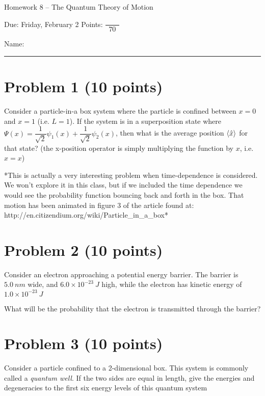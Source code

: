 \documentclass[10pt, letterpaper]{memoir}
\begin{document}
\begin{center}
	{\large Homework 8 -- The Quantum Theory of Motion}
	
	Due: Friday, February 2 \hspace{3em} Points: ${\dfrac{~}{~~70~~}}$
\end{center}

Name: \rule[-.1mm]{15em}{0.1pt}	
	
	\section*{Problem 1  (10 points)}
	Consider a particle-in-a box system where the particle is confined between $x=0$ and $x=1$ (i.e. $L=1$). If the system is in a superposition state where $\Psi(x) = \dfrac{1}{\sqrt{2}}\psi_1(x) + \dfrac{1}{\sqrt{2}}\psi_2(x)$, then what is the average position $\left< \hat{x} \right>$ for that state? (the x-position operator is simply multiplying the function by $x$, i.e.  $\hat{x}=x$)


	\vspace{46em}
	*This is actually a very interesting problem when time-dependence is considered. We won't explore it in this class, but if we included the time dependence we would see the probability function bouncing back and forth in the box. That motion has been animated in figure 3 of the article found at: http://en.citizendium.org/wiki/Particle\_in\_a\_box*
	\newpage
	\section*{Problem 2 (10 points)}
	Consider an electron approaching a potential energy barrier. The barrier is $5.0~nm$ wide, and $6.0\times 10^{-23}~J$ high, while the electron has kinetic energy of $1.0\times 10^{-23}~J$
	
	\noindent What will be the probability that the electron is transmitted through the barrier?
	
	\vspace{25em}
	\section*{Problem 3 (10 points)}
	Consider a particle confined to a 2-dimensional box. This system is commonly called a \emph{quantum well}. If the two sides are equal in length, give the energies and degeneracies to the first six energy levels of this quantum system
	
	\vspace{22em}
\end{document}
